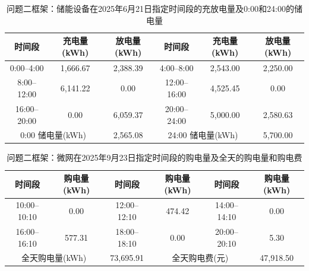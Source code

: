 \begin{table}[H]
  \centering
  \caption{问题二框架：储能设备在2025年6月21日指定时间段的充放电量及0:00和24:00的储电量}
  \label{tab:q4-2-storage-0621}
  \small
  \renewcommand{\arraystretch}{1.3}
  \begin{tabular}{|c|c|c|c|c|c|}
    \hline
    时间段 & 充电量(kWh) & 放电量(kWh) & 时间段 & 充电量(kWh) & 放电量(kWh) \\
    \hline
    0:00--4:00 & 1{,}666.67 & 2{,}388.39 & 4:00--8:00 & 2{,}543.00 & 2{,}250.00 \\
    \hline
    8:00--12:00 & 6{,}141.22 & 0.00 & 12:00--16:00 & 4{,}525.45 & 0.00 \\
    \hline
    16:00--20:00 & 0.00 & 6{,}059.37 & 20:00--24:00 & 5{,}000.00 & 2{,}580.63 \\
    \hline
    \multicolumn{2}{|c|}{0:00 储电量(kWh)} & \multicolumn{1}{c|}{2{,}565.08} & \multicolumn{2}{c|}{24:00 储电量(kWh)} & \multicolumn{1}{c|}{5{,}700.00} \\
    \hline
  \end{tabular}
\end{table}

\begin{table}[H]
  \centering
  \caption{问题二框架：微网在2025年9月23日指定时间段的购电量及全天的购电量和购电费}
  \label{tab:q4-2-purchase-0923}
  \small
  \renewcommand{\arraystretch}{1.3}
  \begin{tabular}{|c|c|c|c|c|c|}
    \hline
    时间段 & 购电量(kWh) & 时间段 & 购电量(kWh) & 时间段 & 购电量(kWh) \\
    \hline
    10:00--10:10 & 0.00 & 12:00--12:10 & 474.42 & 14:00--14:10 & 0.00 \\
    \hline
    16:00--16:10 & 577.31 & 18:00--18:10 & 0.00 & 20:00--20:10 & 5.30 \\
    \hline
    \multicolumn{2}{|c|}{全天购电量(kWh)} & \multicolumn{1}{c|}{73{,}695.91} & \multicolumn{2}{c|}{全天购电费(元)} & \multicolumn{1}{c|}{47{,}918.50} \\
    \hline
  \end{tabular}
\end{table}

